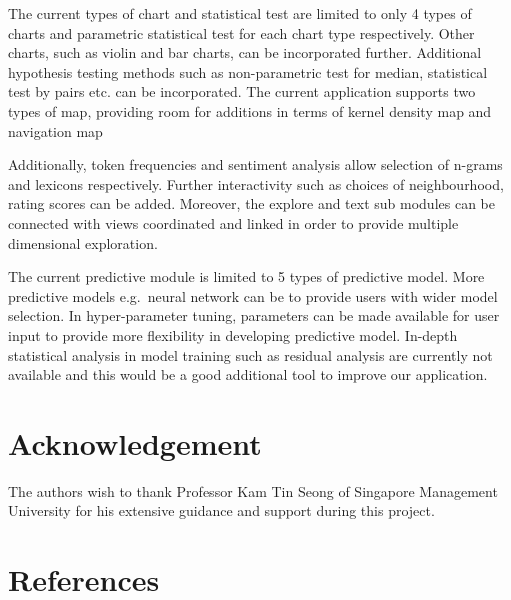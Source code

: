 \documentclass{acm_proc_article-sp}
\begin{document}
The current types of chart and statistical test are limited to only 4
types of charts and parametric statistical test for each chart type
respectively. Other charts, such as violin and bar charts, can be
incorporated further. Additional hypothesis testing methods such as
non-parametric test for median, statistical test by pairs etc. can be
incorporated. The current application supports two types of map,
providing room for additions in terms of kernel density map and
navigation map

Additionally, token frequencies and sentiment analysis allow selection
of n-grams and lexicons respectively. Further interactivity such as
choices of neighbourhood, rating scores can be added. Moreover, the
explore and text sub modules can be connected with views coordinated and
linked in order to provide multiple dimensional exploration.

The current predictive module is limited to 5 types of predictive model.
More predictive models e.g.~neural network can be to provide users with
wider model selection. In hyper-parameter tuning, parameters can be made
available for user input to provide more flexibility in developing
predictive model. In-depth statistical analysis in model training such
as residual analysis are currently not available and this would be a
good additional tool to improve our application.

\hypertarget{acknowledgement}{%
\section{Acknowledgement}\label{acknowledgement}}

The authors wish to thank Professor Kam Tin Seong of Singapore
Management University for his extensive guidance and support during this
project.

\hypertarget{references}{%
\section*{References}\label{references}}
\end{document}
